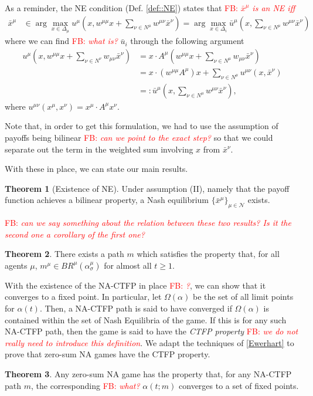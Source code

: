 \documentclass{article}
\theoremstyle{definition}
\newtheorem{theorem}{Theorem}
\newcommand{\fb}[1]{\textcolor{red}{FB: \textit{#1}}}
\newcommand{\agentset}{\mathcal{N}}
\newcommand{\xmu}{x^{\mu}}
\newcommand{\NE}[1]{\bar{x}^{#1}}
\begin{document}
  As a reminder, the NE condition (Def. \ref{def::NE}) states that \fb{$\NE{\mu}$ is an NE iff}
%
  \begin{align*}
    \NE{\mu} &\in \arg\max_{x \in \Delta_\mu} u^\mu(x, w^{\mu \mu}x + \sum_{\nu \in N^\mu} w^{\mu \nu} \NE{\nu}) \nonumber  = \arg\max_{x \in \Delta_i} \bar{u}^\mu(x, \sum_{\nu \in N^\mu} w^{\mu \nu} \NE{\nu})
  \end{align*}
%
  where we can find \fb{what is?} $\bar{u}_i$ through the following argument
%  
  \begin{align}
    u^\mu(x, w^{\mu \mu} x + \sum_{\nu \in N^\nu} w_{\mu \nu} \NE{\nu}) & = x \cdot A^\mu (w^{\mu \mu} x + \sum_{\nu \in N^\mu} w_{\mu \nu} \NE{\nu}) \\
     & = x \cdot (w^{\mu \mu} A^\mu)  x + \sum_{\nu \in N^\mu} u^{\mu \nu}(x, \NE{\nu}) \\
     & =: \bar{u}^\mu(x, \sum_{\nu \in N^\mu} w^{\mu \nu} \NE{\nu}), \nonumber
  \end{align}
%  
  where $u^{\mu \nu}(\xmu, x^\nu) = \xmu \cdot A^\mu x^\nu$.

  Note
  that, in order to get this formulation, we had to use the assumption
  of payoffs being bilinear \fb{can we point to the exact step?} so that we could separate out the term in
  the weighted sum involving $x$ from $\bar{x}^\nu$.

  With these in place, we can state our main results.
  
  \begin{theorem}[Existence of NE]
    Under assumption (II), namely that the payoff function achieves a bilinear property, a
    Nash equilibrium $\{\bar{x}^\mu\}_{\mu \in \agentset}$ exists.
  \end{theorem}

  \fb{can we say something about the relation between these two results? Is it the second one a corollary of the first one?}


  \begin{theorem}
    There exists a path $m$ which satisfies the property that, for all agents $\mu$, $m^\mu \in
    BR^\mu(\alpha_\sigma^\mu)$ for almost all $t \geq 1$.
  \end{theorem}

With the existence of the NA-CTFP in place \fb{?}, we can show that it converges
to a fixed point. In particular, let $\Omega(\alpha)$ be the set of
all limit points for $\alpha(t)$. Then, a NA-CTFP path is said to have
converged if $\Omega(\alpha)$ is contained within the set of Nash
Equilibria of the game. If this is for any such NA-CTFP path, then the
game is said to have the \emph{CTFP property} \fb{we do not really need to introduce this definition}. We adapt the techniques
of \ref{Ewerhart} to prove that zero-sum NA games have the CTFP
property.
%
  \begin{theorem}
    Any zero-sum NA game has the property that, for any NA-CTFP path $m$, the corresponding \fb{what?} $\alpha(t; m)$ converges to a set of fixed points.
  \end{theorem}
\end{document}

